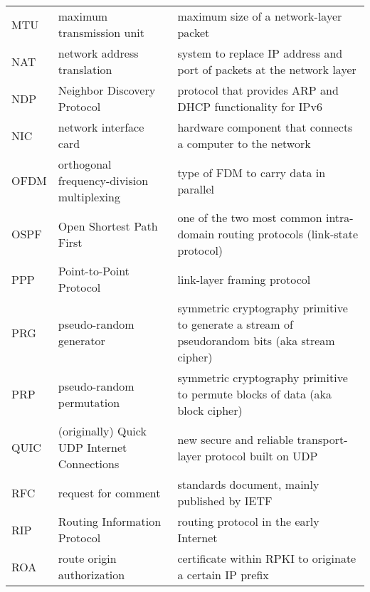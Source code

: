\begin{longtable}{p{1.7cm} | p{5cm} | p{8cm}}
    MTU     & maximum transmission unit                   & maximum size of a network-layer packet                                                              \\
    NAT     & network address translation                 & system to replace IP address and port of packets at the network layer                               \\
    NDP     & Neighbor Discovery Protocol                 & protocol that provides ARP and DHCP functionality for IPv6                                          \\
    NIC     & network interface card                      & hardware component that connects a computer to the network                                          \\
    OFDM    & orthogonal frequency-division multiplexing  & type of FDM to carry data in parallel                                                               \\
    OSPF    & Open Shortest Path First                    & one of the two most common intra-domain routing protocols (link-state protocol)                     \\
    PPP     & Point-to-Point Protocol                     & link-layer framing protocol                                                                         \\
    PRG     & pseudo-random generator                     & symmetric cryptography primitive to generate a stream of pseudorandom bits (aka stream cipher)      \\
    PRP     & pseudo-random permutation                   & symmetric cryptography primitive to permute blocks of data (aka block cipher)                       \\
    QUIC    & (originally) Quick UDP Internet Connections & new secure and reliable transport-layer protocol built on UDP                                       \\
    RFC     & request for comment                         & standards document, mainly published by IETF                                                        \\
    RIP     & Routing Information Protocol                & routing protocol in the early Internet                                                              \\
    ROA     & route origin authorization                  & certificate within RPKI to originate a certain IP prefix                                            \\

\end{longtable}
